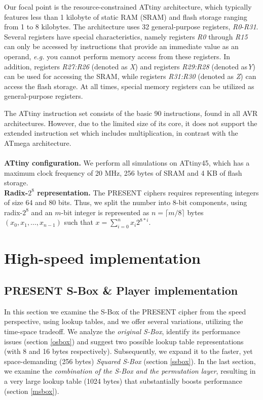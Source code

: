 \documentclass[11pt]{article}
\begin{document}
Our focal point is the resource-constrained ATtiny architecture, which typically features less than 1 kilobyte of static RAM (SRAM) and flash storage ranging from 1 to 8 kilobytes. The architecture uses 32 general-purpose registers, \textit{R0}-\textit{R31}.
Several registers have special characteristics, namely registers \textit{R0} through \textit{R15} can only be accessed by instructions that provide an immediate value as an operand, \emph{e.g.} you cannot perform memory access from these registers. In addition, registers \textit{R27:R26} (denoted as \emph{X}) and registers \textit{R29:R28} (denoted as\emph{Y}) can be used for accessing the SRAM, while registers \textit{R31:R30} (denoted as \emph{Z}) can access the flash storage. At all times, special memory registers can be utilized as general-purpose registers.

The ATtiny instruction set consists of the basic 90 instructions, found in all AVR architectures. However, due to the limited size of its core, it does not support the extended instruction set which includes multiplication, in contrast with the ATmega architecture. \\\\
\textbf{ATtiny configuration.} We perform all simulations on ATtiny45, which has a maximum clock frequency of 20 MHz, 256 bytes of SRAM and 4 KB of flash storage.\\
\textbf{Radix-$2^8$ representation.} The PRESENT ciphers requires representing integers of size 64 and 80 bits. Thus, we split the number into 8-bit components, using radix-$2^8$ and an $m$-bit integer is represented as $n=\lceil{m/8}\rceil$ bytes $(x_0,x_1,\dots,x_{n-1})$ such that $x=\sum_{i=0}^n{x_i 2^{8*i}}$.
\section{High-speed implementation}

\subsection{PRESENT S-Box \& Player implementation}\label{sbox}
In this section we examine the S-Box of the PRESENT cipher from the speed perspective, using lookup tables, and we offer several variations, utilizing the time-space tradeoff. We analyze the \emph{original S-Box}, identify its performance issues (section \ref{osbox}) and suggest two possible lookup table representations (with 8 and 16 bytes respectively). Subsequently, we expand it to the faster, yet space-demanding (256 bytes) \emph{Squared S-Box} (section \ref{ssbox}). In the last section, we examine the \emph{combination of the S-Box and the permutation layer}, resulting in a very large lookup table (1024 bytes) that substantially boosts performance (section \ref{msbox}).
\end{document}
